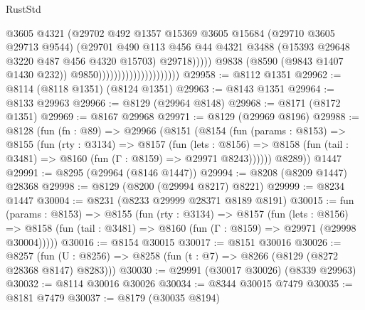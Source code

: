 \begin{lexlean}{RustStd}
\begin{coremodule}
                                                    @3605
                                                    @4321
                                                    (@29702
                                                      @492
                                                      @1357
                                                      @15369
                                                      @3605
                                                      @15684
                                                      (@29710 @3605 @29713 @9544)
                                                      (@29701
                                                        @490
                                                        @113
                                                        @456
                                                        @44
                                                        @4321
                                                        @3488
                                                        (@15393 @29648 @3220 @487 @456 @4320 @15703)
                                                        @29718)))))
                                              @9838
                                              (@8590 (@9843 @1407 @1430 @232))
                                              @9850)))))))))))))))))))))
@29958 := @8112 @1351
@29962 := @8114 (@8118 @1351) (@8124 @1351)
@29963 := @8143 @1351
@29964 := @8133 @29963
@29966 := @8129 (@29964 @8148)
@29968 := @8171 (@8172 @1351)
@29969 := @8167 @29968
@29971 := @8129 (@29969 @8196)
@29988 := @8128
    (fun (fn : @89) =>
    @29966
      (@8151
        (@8154
          (fun (params : @8153) =>
          @8155
            (fun (rty : @3134) =>
            @8157
              (fun (lets : @8156) =>
              @8158 (fun (tail : @3481) => @8160 (fun (Γ : @8159) => @29971 @8243))))))
        @8289))
    @1447
@29991 := @8295 (@29964 (@8146 @1447))
@29994 := @8208 (@8209 @1447) @28368
@29998 := @8129 (@8200 (@29994 @8217) @8221)
@29999 := @8234 @1447
@30004 := @8231 (@8233 @29999 @28371 @8189 @8191)
@30015 := fun (params : @8153) =>
  @8155
    (fun (rty : @3134) =>
    @8157
      (fun (lets : @8156) =>
      @8158 (fun (tail : @3481) => @8160 (fun (Γ : @8159) => @29971 (@29998 @30004)))))
@30016 := @8154 @30015
@30017 := @8151 @30016
@30026 := @8257
    (fun (U : @8256) => @8258 (fun (t : @7) => @8266 (@8129 (@8272 @28368 @8147) @8283)))
@30030 := @29991 (@30017 @30026) (@8339 @29963)
@30032 := @8114 @30016 @30026
@30034 := @8344 @30015 @7479
@30035 := @8181 @7479
@30037 := @8179 (@30035 @8194)

\end{coremodule}
\end{lexlean}
